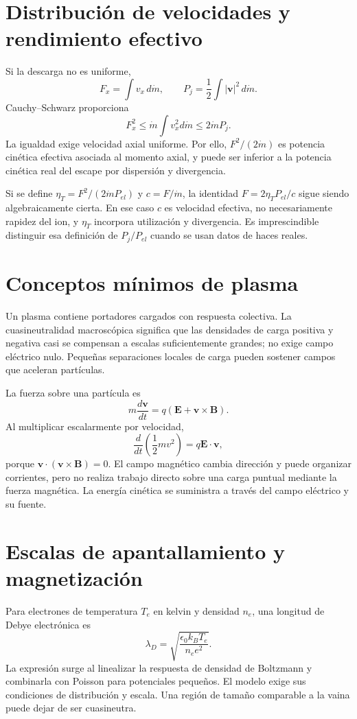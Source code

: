 \section{Distribución de velocidades y rendimiento efectivo}
Si la descarga no es uniforme,
\[
 F_x=\int v_x\,d\dot m,\qquad
 P_j=\frac12\int |\mathbf v|^2\,d\dot m.
\]
Cauchy--Schwarz proporciona
\begin{equation}
 F_x^2\leq\dot m\int v_x^2d\dot m
 \leq2\dot mP_j.
\end{equation}
La igualdad exige velocidad axial uniforme. Por ello, $F^2/(2\dot m)$ es potencia cinética efectiva asociada al momento axial, y puede ser inferior a la potencia cinética real del escape por dispersión y divergencia.

Si se define $\eta_T=F^2/(2\dot mP_{el})$ y $c=F/\dot m$, la identidad $F=2\eta_TP_{el}/c$ sigue siendo algebraicamente cierta. En ese caso $c$ es velocidad efectiva, no necesariamente rapidez del ion, y $\eta_T$ incorpora utilización y divergencia. Es imprescindible distinguir esa definición de $P_j/P_{el}$ cuando se usan datos de haces reales.\cite{JPL-EP}
\section{Conceptos mínimos de plasma}
Un plasma contiene portadores cargados con respuesta colectiva. La cuasineutralidad macroscópica significa que las densidades de carga positiva y negativa casi se compensan a escalas suficientemente grandes; no exige campo eléctrico nulo. Pequeñas separaciones locales de carga pueden sostener campos que aceleran partículas.

La fuerza sobre una partícula es
\[
 m\frac{d\mathbf v}{dt}=q(\mathbf E+\mathbf v\times\mathbf B).
\]
Al multiplicar escalarmente por velocidad,
\[
 \frac{d}{dt}\left(\frac12mv^2\right)=q\mathbf E\cdot\mathbf v,
\]
porque $\mathbf v\cdot(\mathbf v\times\mathbf B)=0$. El campo magnético cambia dirección y puede organizar corrientes, pero no realiza trabajo directo sobre una carga puntual mediante la fuerza magnética. La energía cinética se suministra a través del campo eléctrico y su fuente.
\section{Escalas de apantallamiento y magnetización}
Para electrones de temperatura $T_e$ en kelvin y densidad $n_e$, una longitud de Debye electrónica es
\[
 \lambda_D=\sqrt{\frac{\epsilon_0 k_BT_e}{n_ee^2}}.
\]
La expresión surge al linealizar la respuesta de densidad de Boltzmann y combinarla con Poisson para potenciales pequeños. El modelo exige sus condiciones de distribución y escala. Una región de tamaño comparable a la vaina puede dejar de ser cuasineutra.\cite{JPL-EP}

